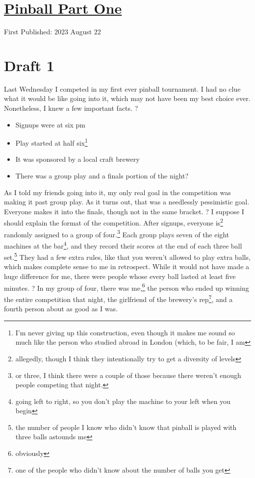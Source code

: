 \documentclass[12pt]{article}[titlepage]
\newcommand{\1}{\={a}}
\newcommand{\2}{\={e}}
\newcommand{\3}{\={\i}}
\newcommand{\4}{\=o}
\newcommand{\5}{\=u}
\newcommand{\6}{\={A}}
\renewcommand{\,}{\textsuperscript{,}}
\begin{document}
\doublespacing
\section{\href{pinball.html}{Pinball Part One}}
First Published: 2023 August 22


\section{Draft 1}
Last Wednesday I competed in my first ever pinball tournament.
I had no clue what it would be like going into it, which may not have been my best choice ever.
Nonetheless, I knew a few important facts.
?
\begin{itemize}
\item Signups were at six pm
\item Play started at half six\footnote{I'm never giving up this construction, even though it makes me sound so much like the person who studied abroad in London (which, to be fair, I am}
\item It was sponsored by a local craft brewery
\item There was a group play and a finals portion of the night?
\end{itemize}
As I told my friends going into it, my only real goal in the competition was making it past group play.
As it turns out, that was a needlessly pessimistic goal.
Everyone makes it into the finals, though not in the same bracket.
?
I suppose I should explain the format of the competition.
After signups, everyone is\footnote{allegedly, though I think they intentionally try to get a diversity of levels} randomly assigned to a group of four.\footnote{or three, I think there were a couple of those because there weren't enough people competing that night.}
Each group plays seven of the eight machines at the bar\footnote{going left to right, so you don't play the machine to your left when you begin}, and they record their scores at the end of each three ball set.\footnote{the number of people I know who didn't know that pinball is played with three balls astounds me}
They had a few extra rules, like that you weren't allowed to play extra balls, which makes complete sense to me in retrospect.
While it would not have made a huge difference for me, there were people whose every ball lasted at least five minutes.
?
In my group of four, there was me,\footnote{obviously} the person who ended up winning the entire competition that night, the girlfriend of the brewery's rep\footnote{one of the people who didn't know about the number of balls you get}, and a fourth person about as good as I was.
\end{document}
